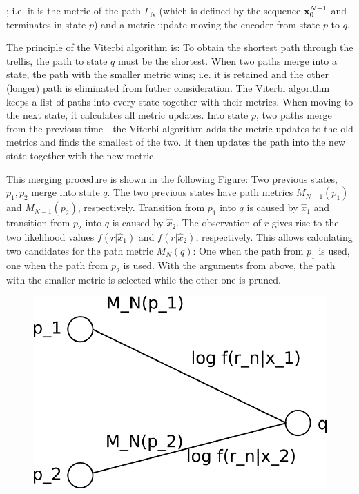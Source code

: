 ; i.e. it is the metric of the path $\Gamma_N$ (which is defined by the sequence $\mathbf{x}_{0}^{N-1}$ and terminates in state $p$) and a metric update moving the encoder from state $p$ to $q$.

The principle of the Viterbi algorithm is: To obtain the shortest path through the trellis, the path to state $q$ must be the shortest. When two paths merge into a state, the path with the smaller metric wins; i.e. it is retained and the other (longer) path is eliminated from futher consideration. The Viterbi algorithm keeps a list of paths into every state together with their metrics. When moving to the next state, it calculates all metric updates. Into state $p$, two paths merge from the previous time - the Viterbi algorithm adds the metric updates to the old metrics and finds the smallest of the two. It then updates the path into the new state together with the new metric.


This merging procedure is shown in the following Figure: Two previous states, $p_1, p_2$ merge into state $q$. The two previous states have path metrics $M_{N-1}(p_1)$ and $M_{N-1}(p_2)$, respectively. Transition from $p_1$ into $q$ is caused by $\hat x_1$ and transition from $p_2$ into $q$ is caused by $\hat x_2$. The observation of $r$ gives rise to the two likelihood values $f(r|\hat x_1)$ and $f(r|\hat x_2)$, respectively. This allows calculating two candidates for the path metric $M_N(q)$: One when the path from $p_1$ is used, one when the path from $p_2$ is used. With the arguments from above, the path with the smaller metric is selected while the other one is pruned.



\begin{figure}[h]
  \includegraphics[scale=1.0]{images/convcodes_1_3.png}
\end{figure}


